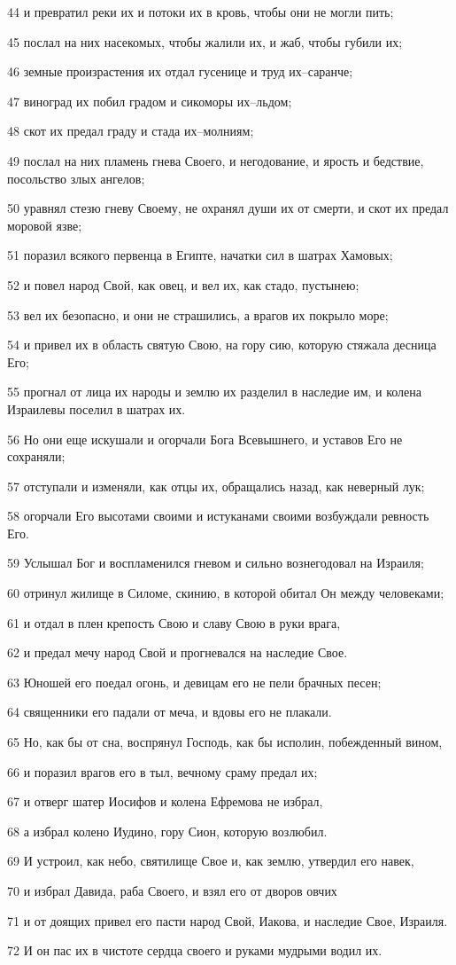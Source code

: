 \par 44 и превратил реки их и потоки их в кровь, чтобы они не могли пить;
\par 45 послал на них насекомых, чтобы жалили их, и жаб, чтобы губили их;
\par 46 земные произрастения их отдал гусенице и труд их--саранче;
\par 47 виноград их побил градом и сикоморы их--льдом;
\par 48 скот их предал граду и стада их--молниям;
\par 49 послал на них пламень гнева Своего, и негодование, и ярость и бедствие, посольство злых ангелов;
\par 50 уравнял стезю гневу Своему, не охранял души их от смерти, и скот их предал моровой язве;
\par 51 поразил всякого первенца в Египте, начатки сил в шатрах Хамовых;
\par 52 и повел народ Свой, как овец, и вел их, как стадо, пустынею;
\par 53 вел их безопасно, и они не страшились, а врагов их покрыло море;
\par 54 и привел их в область святую Свою, на гору сию, которую стяжала десница Его;
\par 55 прогнал от лица их народы и землю их разделил в наследие им, и колена Израилевы поселил в шатрах их.
\par 56 Но они еще искушали и огорчали Бога Всевышнего, и уставов Его не сохраняли;
\par 57 отступали и изменяли, как отцы их, обращались назад, как неверный лук;
\par 58 огорчали Его высотами своими и истуканами своими возбуждали ревность Его.
\par 59 Услышал Бог и воспламенился гневом и сильно вознегодовал на Израиля;
\par 60 отринул жилище в Силоме, скинию, в которой обитал Он между человеками;
\par 61 и отдал в плен крепость Свою и славу Свою в руки врага,
\par 62 и предал мечу народ Свой и прогневался на наследие Свое.
\par 63 Юношей его поедал огонь, и девицам его не пели брачных песен;
\par 64 священники его падали от меча, и вдовы его не плакали.
\par 65 Но, как бы от сна, воспрянул Господь, как бы исполин, побежденный вином,
\par 66 и поразил врагов его в тыл, вечному сраму предал их;
\par 67 и отверг шатер Иосифов и колена Ефремова не избрал,
\par 68 а избрал колено Иудино, гору Сион, которую возлюбил.
\par 69 И устроил, как небо, святилище Свое и, как землю, утвердил его навек,
\par 70 и избрал Давида, раба Своего, и взял его от дворов овчих
\par 71 и от доящих привел его пасти народ Свой, Иакова, и наследие Свое, Израиля.
\par 72 И он пас их в чистоте сердца своего и руками мудрыми водил их.


